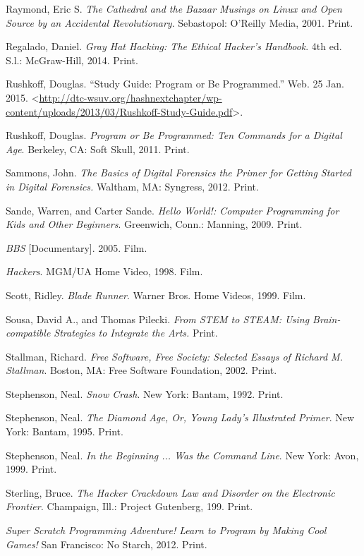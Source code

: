\documentclass[letterpaper,10pt,english]{sphinxmanual}
\begin{document}
Raymond, Eric S. \emph{The Cathedral and the Bazaar Musings on Linux and Open Source by an Accidental Revolutionary}. Sebastopol: O'Reilly Media,
2001. Print.

Regalado, Daniel. \emph{Gray Hat Hacking: The Ethical Hacker's Handbook}. 4th ed. S.l.: McGraw-Hill, 2014. Print.

Rushkoff, Douglas. ``Study Guide: Program or Be Programmed.'' Web. 25 Jan. 2015. \textless{}\href{http://dtc-wsuv.org/hashnextchapter/wp-content/uploads/2013/03/Rushkoff-Study-Guide.pdf}{http://dtc-wsuv.org/hashnextchapter/wp-content/uploads/2013/03/Rushkoff-Study-Guide.pdf}\textgreater{}.

Rushkoff, Douglas. \emph{Program or Be Programmed: Ten Commands for a Digital Age}. Berkeley, CA: Soft Skull, 2011. Print.

Sammons, John. \emph{The Basics of Digital Forensics the Primer for Getting Started in Digital Forensics.} Waltham, MA: Syngress, 2012. Print.

Sande, Warren, and Carter Sande. \emph{Hello World!: Computer Programming for Kids and Other Beginners}. Greenwich, Conn.: Manning, 2009. Print.

\emph{BBS} {[}Documentary{]}. 2005. Film.

\emph{Hackers}. MGM/UA Home Video, 1998. Film.

Scott, Ridley. \emph{Blade Runner}. Warner Bros. Home Videos, 1999. Film.

Sousa, David A., and Thomas Pilecki. \emph{From STEM to STEAM: Using
Brain-compatible Strategies to Integrate the Arts.} Print.

Stallman, Richard. \emph{Free Software, Free Society: Selected Essays of Richard M. Stallman}. Boston, MA: Free Software Foundation, 2002. Print.

Stephenson, Neal. \emph{Snow Crash}. New York: Bantam, 1992. Print.

Stephenson, Neal. \emph{The Diamond Age, Or, Young Lady's Illustrated Primer}.
New York: Bantam, 1995. Print.

Stephenson, Neal. \emph{In the Beginning ... Was the Command Line}. New York:
Avon, 1999. Print.

Sterling, Bruce. \emph{The Hacker Crackdown Law and Disorder on the Electronic Frontier.} Champaign, Ill.: Project Gutenberg, 199. Print.

\emph{Super Scratch Programming Adventure! Learn to Program by Making Cool Games!} San Francisco: No Starch, 2012. Print.
\end{document}
